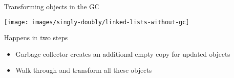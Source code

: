 \begin{frame}[t]{Transforming objects in the GC}%
\vspace*{-6ex}
\begin{center}
\texttt{[image: images/singly-doubly/linked-lists-without-gc]}%
\end{center}
Happens in two steps \\
\begin{itemize}
\item Garbage collector creates an additional empty copy for updated objects
\item Walk through and transform all these objects
\end{itemize}
\end{frame}

% 




